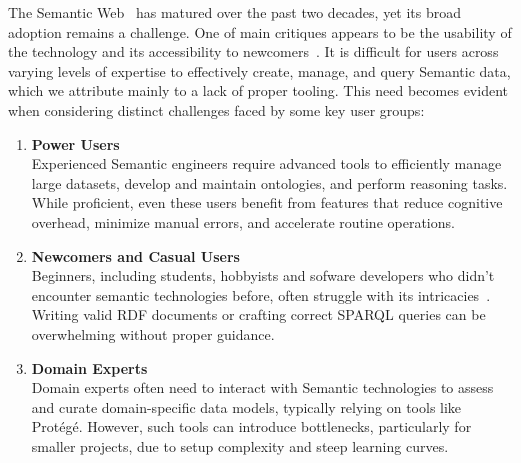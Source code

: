 The Semantic Web~\cite{Berners-Lee_SA_2001} has matured over the past two decades, yet its broad adoption remains a challenge.
One of main critiques appears to be the usability of the technology and its accessibility to newcomers~\cite{10.3233/SW-190387}.
It is difficult for users across varying levels of expertise to effectively create, manage, and query Semantic data, which we attribute mainly to a lack of proper tooling.
This need becomes evident when considering distinct challenges faced by some key user groups:

\begin{enumerate}
  \item \textbf{Power Users}\\
    Experienced Semantic engineers require advanced tools to efficiently manage large datasets, develop and maintain ontologies, and perform reasoning tasks.
    While proficient, even these users benefit from features that reduce cognitive overhead, minimize manual errors, and accelerate routine operations.

  \item \textbf{Newcomers and Casual Users}\\
    Beginners, including students, hobbyists and sofware developers who didn't encounter semantic technologies before, often struggle with its intricacies~\cite{EvensteinSigalov2023,Turki2021RepresentingCI}. 
    Writing valid RDF documents or crafting correct SPARQL queries can be overwhelming without proper guidance. 

\item \textbf{Domain Experts}\\
    Domain experts often need to interact with Semantic technologies to assess and curate domain-specific data models, typically relying on tools like Protégé. 
    However, such tools can introduce bottlenecks, particularly for smaller projects, due to setup complexity and steep learning curves. 


\end{enumerate}
